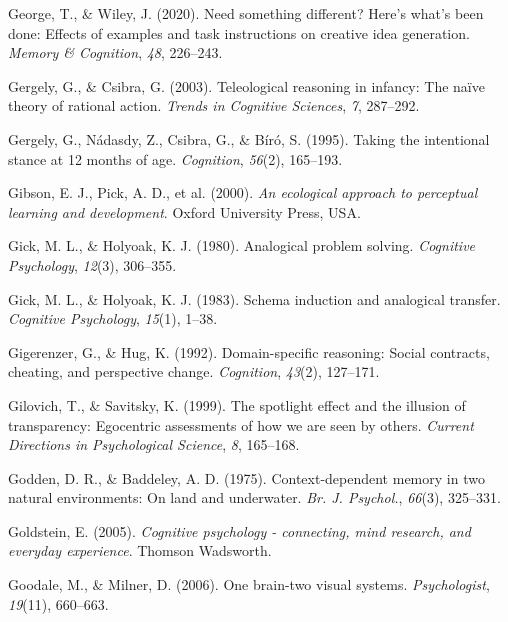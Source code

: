 \documentclass[
]{krantz}
\newlength{\cslhangindent}
\newenvironment{CSLReferences}[2] %
 {\begin{list}{}{%
  \setlength{\itemindent}{0pt}
  \setlength{\leftmargin}{0pt}
  \setlength{\parsep}{0pt}
  \ifodd #1
   \setlength{\leftmargin}{\cslhangindent}
   \setlength{\itemindent}{-1\cslhangindent}
  \fi
  \setlength{\itemsep}{#2\baselineskip}}}
 {\end{list}}
\begin{document}
\begin{CSLReferences}{1}{0}
George, T., \& Wiley, J. (2020). Need something different? Here's what's been done: Effects of examples and task instructions on creative idea generation. \emph{Memory \& Cognition}, \emph{48}, 226--243.

Gergely, G., \& Csibra, G. (2003). Teleological reasoning in infancy: The naïve theory of rational action. \emph{Trends in Cognitive Sciences}, \emph{7}, 287--292.

Gergely, G., Nádasdy, Z., Csibra, G., \& Bíró, S. (1995). Taking the intentional stance at 12 months of age. \emph{Cognition}, \emph{56}(2), 165--193.

{Gibson, E. J., Pick, A. D., et al.} (2000). \emph{An ecological approach to perceptual learning and development}. Oxford University Press, USA.

Gick, M. L., \& Holyoak, K. J. (1980). Analogical problem solving. \emph{Cognitive Psychology}, \emph{12}(3), 306--355.

Gick, M. L., \& Holyoak, K. J. (1983). Schema induction and analogical transfer. \emph{Cognitive Psychology}, \emph{15}(1), 1--38.

Gigerenzer, G., \& Hug, K. (1992). Domain-specific reasoning: Social contracts, cheating, and perspective change. \emph{Cognition}, \emph{43}(2), 127--171.

Gilovich, T., \& Savitsky, K. (1999). The spotlight effect and the illusion of transparency: Egocentric assessments of how we are seen by others. \emph{Current Directions in Psychological Science}, \emph{8}, 165--168.

Godden, D. R., \& Baddeley, A. D. (1975). Context-dependent memory in two natural environments: On land and underwater. \emph{Br. J. Psychol.}, \emph{66}(3), 325--331.

Goldstein, E. (2005). \emph{Cognitive psychology - connecting, mind research, and everyday experience}. Thomson Wadsworth.

Goodale, M., \& Milner, D. (2006). One brain-two visual systems. \emph{Psychologist}, \emph{19}(11), 660--663.


\end{CSLReferences}
\end{document}
